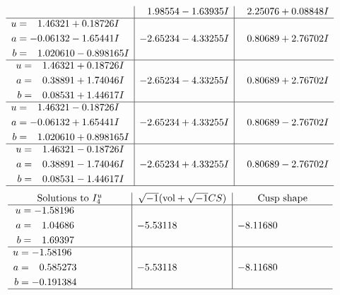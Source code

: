 \documentclass[1p]{elsarticle_modified}
\theoremstyle{definition}
\newcommand{\I}{\sqrt{-1}}
\begin{document}
$$\begin{array}{c|c|c}
 & \phantom{-}1.98554 - 1.63935 I & \phantom{-}2.25076 + 0.08848 I \\ \hline\begin{aligned}
u &= \phantom{-}1.46321 + 0.18726 I \\
a &= -0.06132 - 1.65441 I \\
b &= \phantom{-}1.020610 - 0.898165 I\end{aligned}
 & -2.65234 - 4.33255 I & \phantom{-}0.80689 + 2.76702 I \\ \hline\begin{aligned}
u &= \phantom{-}1.46321 + 0.18726 I \\
a &= \phantom{-}0.38891 + 1.74046 I \\
b &= \phantom{-}0.08531 + 1.44617 I\end{aligned}
 & -2.65234 - 4.33255 I & \phantom{-}0.80689 + 2.76702 I \\ \hline\begin{aligned}
u &= \phantom{-}1.46321 - 0.18726 I \\
a &= -0.06132 + 1.65441 I \\
b &= \phantom{-}1.020610 + 0.898165 I\end{aligned}
 & -2.65234 + 4.33255 I & \phantom{-}0.80689 - 2.76702 I \\ \hline\begin{aligned}
u &= \phantom{-}1.46321 - 0.18726 I \\
a &= \phantom{-}0.38891 - 1.74046 I \\
b &= \phantom{-}0.08531 - 1.44617 I\end{aligned}
 & -2.65234 + 4.33255 I & \phantom{-}0.80689 - 2.76702 I\\
 \hline 
 \end{array}$$\newpage$$\begin{array}{c|c|c}  
\text{Solutions to }I^u_{4}& \I (\text{vol} + \sqrt{-1}CS) & \text{Cusp shape}\\
 \hline 
\begin{aligned}
u &= -1.58196\phantom{ +0.000000I} \\
a &= \phantom{-}1.04686\phantom{ +0.000000I} \\
b &= \phantom{-}1.69397\phantom{ +0.000000I}\end{aligned}
 & -5.53118\phantom{ +0.000000I} & -8.11680\phantom{ +0.000000I} \\ \hline\begin{aligned}
u &= -1.58196\phantom{ +0.000000I} \\
a &= \phantom{-}0.585273\phantom{ +0.000000I} \\
b &= -0.191384\phantom{ +0.000000I}\end{aligned}
 & -5.53118\phantom{ +0.000000I} & -8.11680\phantom{ +0.000000I}\\
 \hline 
 \end{array}$$\newpage
\end{document}
